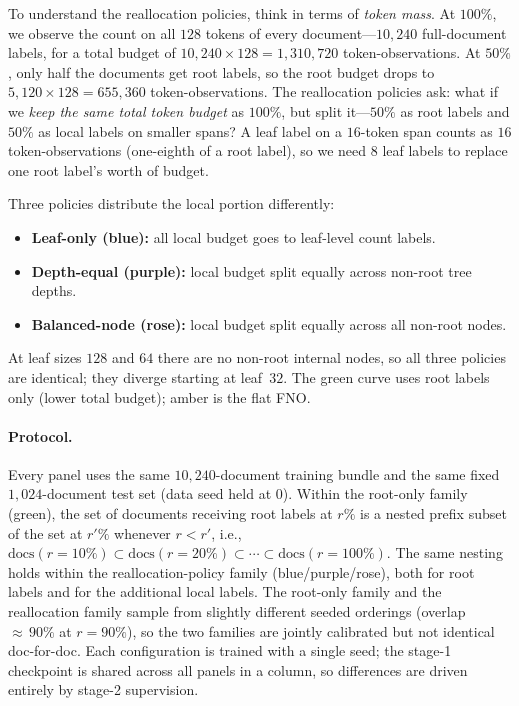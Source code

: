 To understand the reallocation policies, think in terms of \emph{token mass}. At $100\%$, we observe the count on all $128$ tokens of every document---$10{,}240$ full-document labels, for a total budget of $10{,}240 \times 128 = 1{,}310{,}720$ token-observations. At $50\%$, only half the documents get root labels, so the root budget drops to $5{,}120 \times 128 = 655{,}360$ token-observations. The reallocation policies ask: what if we \emph{keep the same total token budget} as $100\%$, but split it---$50\%$ as root labels and $50\%$ as local labels on smaller spans? A leaf label on a $16$-token span counts as $16$ token-observations (one-eighth of a root label), so we need $8$ leaf labels to replace one root label's worth of budget.

Three policies distribute the local portion differently:
\begin{itemize}[leftmargin=1.5em]
    \item \textbf{Leaf-only (blue):} all local budget goes to leaf-level count labels.
    \item \textbf{Depth-equal (purple):} local budget split equally across non-root tree depths.
    \item \textbf{Balanced-node (rose):} local budget split equally across all non-root nodes.
\end{itemize}
At leaf sizes $128$ and $64$ there are no non-root internal nodes, so all three policies are identical; they diverge starting at leaf~$32$. The green curve uses root labels only (lower total budget); amber is the flat FNO.

\paragraph{Protocol.}
Every panel uses the same $10{,}240$-document training bundle and the same fixed $1{,}024$-document test set (data seed held at $0$). Within the root-only family (green), the set of documents receiving root labels at $r\%$ is a nested prefix subset of the set at $r'\%$ whenever $r<r'$, i.e., $\mathrm{docs}(r{=}10\%)\subset\mathrm{docs}(r{=}20\%)\subset\cdots\subset\mathrm{docs}(r{=}100\%)$. The same nesting holds within the reallocation-policy family (blue/purple/rose), both for root labels and for the additional local labels. The root-only family and the reallocation family sample from slightly different seeded orderings (overlap ${\approx}\,90\%$ at $r{=}90\%$), so the two families are jointly calibrated but not identical doc-for-doc. Each configuration is trained with a single seed; the stage-1 checkpoint is shared across all panels in a column, so differences are driven entirely by stage-2 supervision.

